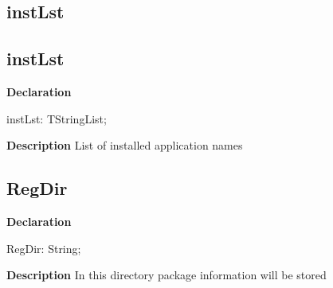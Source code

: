\documentclass{report}
\newif\ifpdf
\begin{document}
\subsection*{\large{\textbf{instLst}}\normalsize\hspace{1ex}\hrulefill}
\else
\subsection*{instLst}
\fi
\label{manager-instLst}
\begin{list}{}{
\setlength{\itemindent}{0cm}
\setlength{\listparindent}{0cm}
\setlength{\leftmargin}{\evensidemargin}
\addtolength{\leftmargin}{\tmplength}
\settowidth{\labelsep}{X}
\addtolength{\leftmargin}{\labelsep}
\setlength{\labelwidth}{\tmplength}
}
\item[\textbf{Declaration}\hfill]
\ifpdf
\begin{flushleft}
\fi
\begin{ttfamily}
instLst: TStringList;\end{ttfamily}

\ifpdf
\end{flushleft}
\fi

\par
\item[\textbf{Description}]
List of installed application names

\end{list}
\ifpdf
\subsection*{\large{\textbf{RegDir}}\normalsize\hspace{1ex}\hrulefill}
\else
\subsection*{RegDir}
\fi
\label{manager-RegDir}
\begin{list}{}{
\setlength{\itemindent}{0cm}
\setlength{\listparindent}{0cm}
\setlength{\leftmargin}{\evensidemargin}
\addtolength{\leftmargin}{\tmplength}
\settowidth{\labelsep}{X}
\addtolength{\leftmargin}{\labelsep}
\setlength{\labelwidth}{\tmplength}
}
\item[\textbf{Declaration}\hfill]
\ifpdf
\begin{flushleft}
\fi
\begin{ttfamily}
RegDir: String;\end{ttfamily}

\ifpdf
\end{flushleft}
\fi

\par
\item[\textbf{Description}]
In this directory package information will be stored

\end{list}
\end{document}
